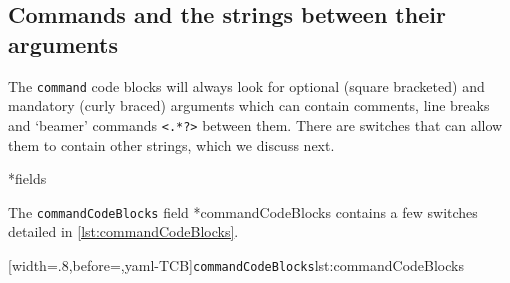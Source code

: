 \subsection{Commands and the strings between their arguments}\label{subsec:commands-string-between} The \texttt{command} code blocks will
 always look for optional (square bracketed) and mandatory (curly braced) arguments which
 can contain comments, line breaks and `beamer' commands \lstinline!<.*?>! between them.
 There are switches that can allow them to contain other strings, which we discuss next.

*{fields}

 The \texttt{commandCodeBlocks} field *{commandCodeBlocks} contains
 a few switches detailed in \cref{lst:commandCodeBlocks}.%

 [width=.8\linewidth,before=\centering,yaml-TCB]{\texttt{commandCodeBlocks}}{lst:commandCodeBlocks}


